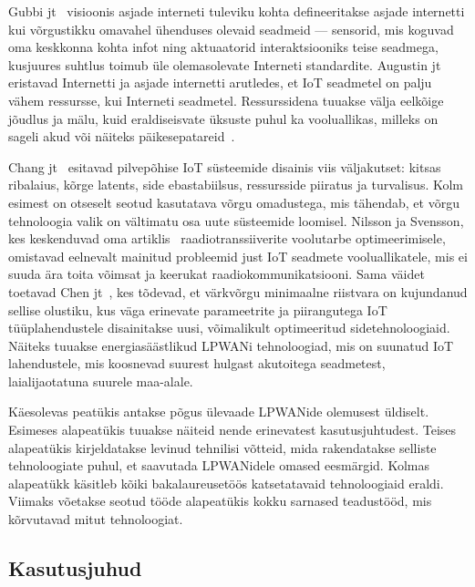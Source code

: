\documentclass[12pt]{article}
\begin{document}
    Gubbi jt~\cite{gubbi2013internet} visioonis asjade interneti tuleviku kohta defineeritakse asjade internetti kui võrgustikku omavahel ühenduses olevaid seadmeid — sensorid, mis koguvad oma keskkonna kohta infot ning aktuaatorid interaktsiooniks teise seadmega, kusjuures suhtlus toimub üle olemasolevate Interneti standardite.
    Augustin jt~\cite{augustin2016study} eristavad Internetti ja asjade internetti arutledes, et IoT seadmetel on palju vähem ressursse, kui Interneti seadmetel.
    Ressurssidena tuuakse välja eelkõige jõudlus ja mälu, kuid eraldiseisvate üksuste puhul ka vooluallikas, milleks on sageli akud või näiteks päikesepatareid~\cite{mabon2019smaller}.

    Chang jt~\cite{chang2019internet} esitavad pilvepõhise IoT süsteemide disainis viis väljakutset: kitsas ribalaius, kõrge latents, side ebastabiilsus, ressursside piiratus ja turvalisus.
    Kolm esimest on otseselt seotud kasutatava võrgu omadustega, mis tähendab, et võrgu tehnoloogia valik on vältimatu osa uute süsteemide loomisel.
    Nilsson ja Svensson, kes keskenduvad oma artiklis~\cite{nilsson2014power} raadiotranssiiverite voolutarbe optimeerimisele, omistavad eelnevalt mainitud probleemid just IoT seadmete vooluallikatele, mis ei suuda ära toita võimsat ja keerukat raadiokommunikatsiooni.
    Sama väidet toetavad Chen jt~\cite{chen2018cognitive}, kes tõdevad, et värkvõrgu minimaalne riistvara on kujundanud sellise olustiku, kus väga erinevate parameetrite ja piirangutega IoT tüüplahendustele disainitakse uusi, võimalikult optimeeritud sidetehnoloogiaid.
    Näiteks tuuakse energiasäästlikud LPWANi tehnoloogiad, mis on suunatud IoT lahendustele, mis koosnevad suurest hulgast akutoitega seadmetest, laialijaotatuna suurele maa-alale.

    Käesolevas peatükis antakse põgus ülevaade LPWANide olemusest üldiselt.
    Esimeses alapeatükis tuuakse näiteid nende erinevatest kasutusjuhtudest.
    Teises alapeatükis kirjeldatakse levinud tehnilisi võtteid, mida rakendatakse selliste tehnoloogiate puhul, et saavutada LPWANidele omased eesmärgid.
    Kolmas alapeatükk käsitleb kõiki bakalaureusetöös katsetatavaid tehnoloogiaid eraldi.
    Viimaks võetakse seotud tööde alapeatükis kokku sarnased teadustööd, mis kõrvutavad mitut tehnoloogiat.

    \subsection{Kasutusjuhud}\label{kasutusjuhud}
\end{document}
